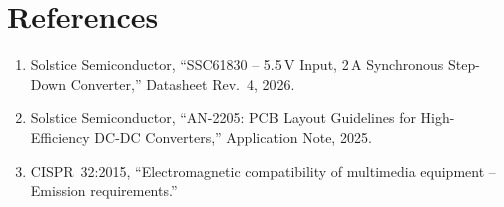 \section*{References}
\begin{enumerate}[leftmargin=1.6em,itemsep=2pt]
\item\label{ref:datasheet} Solstice Semiconductor, ``SSC61830 -- 5.5\,V
      Input, 2\,A Synchronous Step-Down Converter,'' Datasheet Rev.~4, 2026.
\item Solstice Semiconductor, ``AN-2205: PCB Layout Guidelines for
      High-Efficiency DC-DC Converters,'' Application Note, 2025.
\item\label{ref:cispr} CISPR~32:2015, ``Electromagnetic compatibility of
      multimedia equipment -- Emission requirements.''
\end{enumerate}
